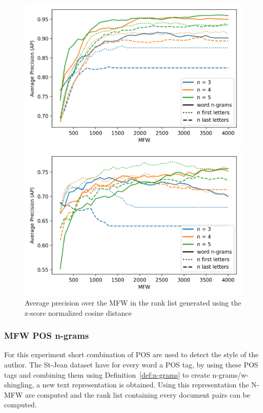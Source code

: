 \begin{figure}
  \centering
  \caption{Average precision over the MFW in the rank list generated using the z-score normalized cosine distance}

  \label{fig:first_last_letters_ngrams_oxquarry}
  \includegraphics[width=\linewidth]{img/first_last_letters_ngrams_oxquarry.png}

  \label{fig:first_last_letters_ngrams_brunet}
  \includegraphics[width=\linewidth]{img/first_last_letters_ngrams_brunet.png}
\end{figure}

\subsubsection{MFW POS n-grams}

For this experiment short combination of POS are used to detect the style of the author.
The St-Jean dataset have for every word a POS tag, by using these POS tags and combining them using Definition~\ref{def:n-grams} to create n-grams/w-shingling, a new text representation is obtained.
Using this representation the N-MFW are computed and the rank list containing every document pairs can be computed.

